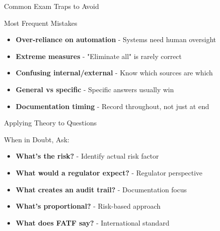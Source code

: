 \documentclass{beamer}
\begin{document}
\begin{frame}{Common Exam Traps to Avoid}
\begin{alertblock}{Most Frequent Mistakes}
\begin{itemize}
    \item \textbf{Over-reliance on automation} - Systems need human oversight
    \item \textbf{Extreme measures} - "Eliminate all" is rarely correct
    \item \textbf{Confusing internal/external} - Know which sources are which
    \item \textbf{General vs specific} - Specific answers usually win
    \item \textbf{Documentation timing} - Record throughout, not just at end
\end{itemize}
\end{alertblock}
\end{frame}

\begin{frame}{Applying Theory to Questions}
\begin{block}{When in Doubt, Ask:}
\begin{itemize}
    \item \textbf{What's the risk?} - Identify actual risk factor
    \item \textbf{What would a regulator expect?} - Regulator perspective
    \item \textbf{What creates an audit trail?} - Documentation focus
    \item \textbf{What's proportional?} - Risk-based approach
    \item \textbf{What does FATF say?} - International standard
\end{itemize}
\end{block}
\end{frame}
\end{document}
